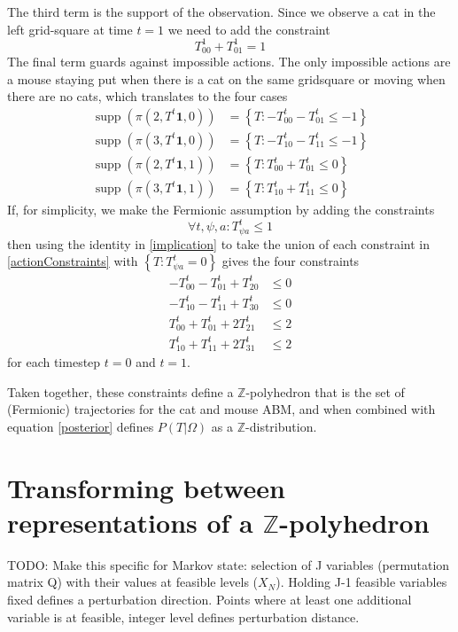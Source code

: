 \documentclass{article}
\DeclareMathOperator\supp{supp}
\begin{document}
The third term is the support of the observation. Since we observe a cat in the left grid-square at time $t=1$ we need to add the constraint
\[
T^1_{0 0} + T^1_{0 1} = 1
\]
The final term guards against impossible actions. The only impossible actions are a mouse staying put when there is a cat on the same gridsquare or moving when there are no cats, which translates to the four cases
\begin{equation}
\begin{aligned}
\supp(\pi(2,T^t\mathbf{1},0)) &= \left\{ T: -T^t_{0 0} - T^t_{0 1} \le -1 \right\}\\
\supp(\pi(3,T^t\mathbf{1},0)) &= \left\{ T: -T^t_{1 0} - T^t_{1 1} \le -1 \right\}\\
\supp(\pi(2,T^t\mathbf{1},1)) &= \left\{ T: T^t_{0 0} + T^t_{0 1} \le 0 \right\}\\
\supp(\pi(3,T^t\mathbf{1},1)) &= \left\{ T: T^t_{1 0} + T^t_{1 1} \le 0 \right\}
\end{aligned}
\label{actionConstraints}
\end{equation}
If, for simplicity, we make the Fermionic assumption by adding the constraints
\[
\forall t,\psi,a: T^t_{\psi a} \le 1
\]
then using the identity in \eqref{implication} to take the union of each constraint in \eqref{actionConstraints} with $\left\{T: T^t_{\psi a} = 0\right\}$ gives the four constraints
\[
\begin{aligned}
-T^t_{0 0} - T^t_{0 1} + T^t_{2 0} & \le 0\\
-T^t_{1 0} - T^t_{1 1} + T^t_{3 0} & \le 0\\
T^t_{0 0} + T^t_{0 1} + 2T^t_{2 1} & \le 2 \\
T^t_{1 0} + T^t_{1 1} + 2T^t_{3 1} & \le 2
\end{aligned}
\]
for each timestep $t=0$ and $t=1$.

Taken together, these constraints define a $\mathbb{Z}$-polyhedron that is the set of (Fermionic) trajectories for the cat and mouse ABM, and when combined with equation \eqref{posterior} defines $P(T|\Omega)$ as a $\mathbb{Z}$-distribution.

\section{Transforming between representations of a $\mathbb{Z}$-polyhedron}

TODO: Make this specific for Markov state: selection of J variables (permutation matrix Q) with their values at feasible levels ($X_N$). Holding J-1 feasible variables fixed defines a perturbation direction. Points where at least one additional variable is at feasible, integer level defines perturbation distance.
\end{document}
